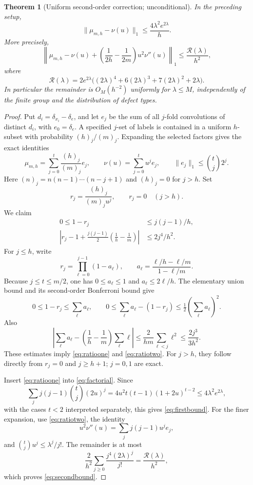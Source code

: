 \documentclass[11pt]{article}
\newtheorem{theorem}{Theorem}[section]
\theoremstyle{remark}\newtheorem{remark}[theorem]{Remark}
\begin{document}
\begin{theorem}[Uniform second-order correction; unconditional]\label{thm:expansion}
In the preceding setup,
\begin{equation}\label{eq:firstbound}
 \|\mu_{m,h}-\nu(u)\|_1\le\frac{4\lambda^2e^{2\lambda}}h.
\end{equation}
More precisely,
\begin{equation}\label{eq:secondbound}
 \left\|\mu_{m,h}-\nu(u)
  +\left(\frac1{2h}-\frac1{2m}\right)u^2\nu''(u)\right\|_1
 \le\frac{\mathcal R(\lambda)}{h^2},
\end{equation}
where
\[
 \mathcal R(\lambda)=2e^{2\lambda}
 \bigl((2\lambda)^4+6(2\lambda)^3+7(2\lambda)^2+2\lambda\bigr).
\]
In particular the remainder is $O_M(h^{-2})$ uniformly for $\lambda\le M$, independently of the finite group and the distribution of defect types.
\end{theorem}
\begin{proof}
Put $d_i=\delta_{x_i}-\delta_e$, and let $e_j$ be the sum of all $j$-fold convolutions of distinct $d_i$, with $e_0=\delta_e$. A specified $j$-set of labels is contained in a uniform $h$-subset with probability $(h)_j/(m)_j$. Expanding the selected factors gives the exact identities
\begin{equation}\label{eq:factorial}
 \mu_{m,h}=\sum_{j=0}^t\frac{(h)_j}{(m)_j}e_j,
 \qquad\nu(u)=\sum_{j=0}^t u^je_j,
 \qquad\|e_j\|_1\le\binom tj2^j.
\end{equation}
Here $(n)_j=n(n-1)\cdots(n-j+1)$ and $(h)_j=0$ for $j>h$. Set
\[
 r_j=\frac{(h)_j}{(m)_ju^j},\qquad r_j=0\quad(j>h).
\]
We claim
\begin{align}
 0\le1-r_j&\le j(j-1)/h,\label{eq:ratioone}\\
 \left|r_j-1+\frac{j(j-1)}2\left(\frac1h-\frac1m\right)\right|
 &\le2j^4/h^2.\label{eq:ratiotwo}
\end{align}
For $j\le h$, write
\[
 r_j=\prod_{\ell=0}^{j-1}(1-a_\ell),\qquad
 a_\ell=\frac{\ell/h-\ell/m}{1-\ell/m}.
\]
Because $j\le t\le m/2$, one has $0\le a_\ell\le1$ and $a_\ell\le2\ell/h$. The elementary union bound and its second-order Bonferroni bound give
\[
 0\le1-r_j\le\sum_\ell a_\ell,\qquad
 0\le\sum_\ell a_\ell-(1-r_j)\le\tfrac12(\sum_\ell a_\ell)^2.
\]
Also
\[
 \left|\sum_\ell a_\ell
       -\left(\frac1h-\frac1m\right)\sum_\ell\ell\right|
 \le\frac2{hm}\sum_{\ell<j}\ell^2
 \le\frac{2j^3}{3h^2}.
\]
These estimates imply \eqref{eq:ratioone} and \eqref{eq:ratiotwo}. For $j>h$, they follow directly from $r_j=0$ and $j\ge h+1$; $j=0,1$ are exact.

Insert \eqref{eq:ratioone} into \eqref{eq:factorial}. Since
\[
 \sum_jj(j-1)\binom tj(2u)^j
 =4u^2t(t-1)(1+2u)^{t-2}\le4\lambda^2e^{2\lambda},
\]
with the cases $t<2$ interpreted separately, this gives \eqref{eq:firstbound}. For the finer expansion, use \eqref{eq:ratiotwo}, the identity
\[
 u^2\nu''(u)=\sum_jj(j-1)u^je_j,
\]
and $\binom tj u^j\le\lambda^j/j!$. The remainder is at most
\[
 \frac2{h^2}\sum_{j\ge0}\frac{j^4(2\lambda)^j}{j!}
 =\frac{\mathcal R(\lambda)}{h^2},
\]
which proves \eqref{eq:secondbound}.
\end{proof}
\end{document}
